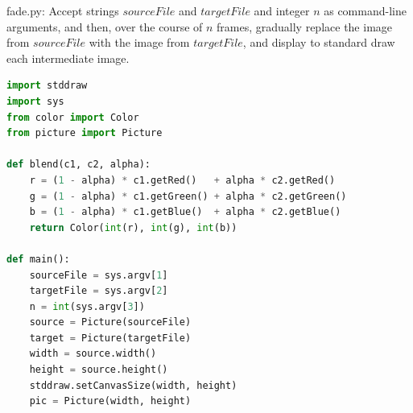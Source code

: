 \documentclass[8pt,a4paper,compress]{beamer}
\begin{document}
\begin{frame}[fragile]
\pause

\begin{framed}
\tiny fade.py: Accept strings $sourceFile$ and $targetFile$ and integer $n$ as command-line arguments, and then, over the course of $n$ frames, gradually replace the image from $sourceFile$ with the image from $targetFile$, and display to standard draw each intermediate image. 
\end{framed}

\begin{lstlisting}[language=Python]
import stddraw
import sys
from color import Color
from picture import Picture

def blend(c1, c2, alpha):
    r = (1 - alpha) * c1.getRed()   + alpha * c2.getRed()
    g = (1 - alpha) * c1.getGreen() + alpha * c2.getGreen()
    b = (1 - alpha) * c1.getBlue()  + alpha * c2.getBlue()
    return Color(int(r), int(g), int(b))

def main():
    sourceFile = sys.argv[1]
    targetFile = sys.argv[2]
    n = int(sys.argv[3])
    source = Picture(sourceFile)
    target = Picture(targetFile)
    width = source.width()
    height = source.height()
    stddraw.setCanvasSize(width, height)
    pic = Picture(width, height)
\end{lstlisting}
\end{frame}
\end{document}
